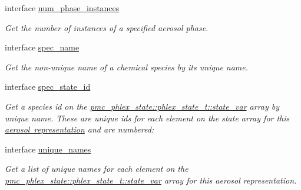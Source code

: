 \begin{DoxyCompactItemize}
interface \mbox{\hyperlink{interfacepmc__aero__rep__data_1_1num__phase__instances}{num\+\_\+phase\+\_\+instances}}
\begin{DoxyCompactList}\small\item\em Get the number of instances of a specified aerosol phase. \end{DoxyCompactList}\item 
interface \mbox{\hyperlink{interfacepmc__aero__rep__data_1_1spec__name}{spec\+\_\+name}}
\begin{DoxyCompactList}\small\item\em Get the non-\/unique name of a chemical species by its unique name. \end{DoxyCompactList}\item 
interface \mbox{\hyperlink{interfacepmc__aero__rep__data_1_1spec__state__id}{spec\+\_\+state\+\_\+id}}
\begin{DoxyCompactList}\small\item\em Get a species id on the {\ttfamily \mbox{\hyperlink{structpmc__phlex__state_1_1phlex__state__t_a78835cb552d483ebbfc7a6bc6f756918}{pmc\+\_\+phlex\+\_\+state\+::phlex\+\_\+state\+\_\+t\+::state\+\_\+var}}} array by unique name. These are unique ids for each element on the state array for this \mbox{\hyperlink{phlex_aero_rep}{aerosol representation}} and are numbered\+: \end{DoxyCompactList}\item 
interface \mbox{\hyperlink{interfacepmc__aero__rep__data_1_1unique__names}{unique\+\_\+names}}
\begin{DoxyCompactList}\small\item\em Get a list of unique names for each element on the {\ttfamily \mbox{\hyperlink{structpmc__phlex__state_1_1phlex__state__t_a78835cb552d483ebbfc7a6bc6f756918}{pmc\+\_\+phlex\+\_\+state\+::phlex\+\_\+state\+\_\+t\+::state\+\_\+var}}} array for this aerosol representation. \end{DoxyCompactList}\end{DoxyCompactItemize}
